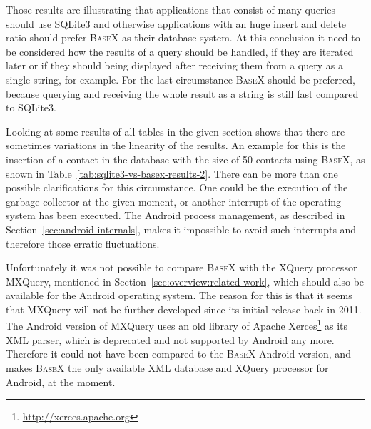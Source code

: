 Those results are illustrating that applications that consist of many queries should use SQLite3 and otherwise applications with an huge insert and delete ratio should prefer \textsc{BaseX} as their database system.
At this conclusion it need to be considered how the results of a query should be handled, if they are iterated later or if they should being displayed after receiving them from a query as a single string, for example.
For the last circumstance \textsc{BaseX} should be preferred, because querying and receiving the whole result as a string is still fast compared to SQLite3.

Looking at some results of all tables in the given section shows that there are sometimes variations in the linearity of the results.
An example for this is the insertion of a contact in the database with the size of 50 contacts using \textsc{BaseX}, as shown in Table~\ref{tab:sqlite3-vs-basex-results-2}.
There can be more than one possible clarifications for this circumstance.
One could be the execution of the garbage collector at the given moment, or another interrupt of the operating system has been executed.
The Android process management, as described in Section~\ref{sec:android-internals}, makes it impossible to avoid such interrupts and therefore those erratic fluctuations. 


Unfortunately it was not possible to compare \textsc{BaseX} with the XQuery processor MXQuery, mentioned in Section~\ref{sec:overview:related-work}, which should also be available for the Android operating system.
The reason for this is that it seems that MXQuery will not be further developed since its initial release back in 2011.
The Android version of MXQuery uses an old library of Apache Xerces\footnote{\url{http://xerces.apache.org}} as its XML parser, which is deprecated and not supported by Android any more.
Therefore it could not have been compared to the \textsc{BaseX} Android version, and makes \textsc{BaseX} the only available XML database and XQuery processor for Android, at the moment.

%
\newpage
